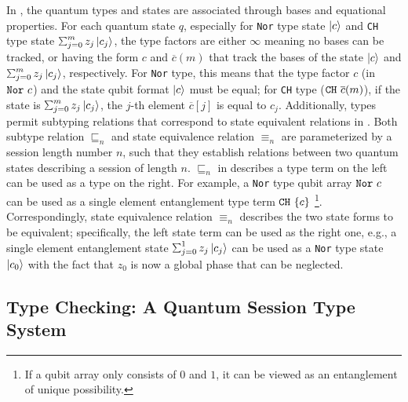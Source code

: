 In \qafny, the quantum types and states are associated through bases and equational properties.
For each quantum state $q$, especially for \texttt{Nor} type state $\left\vert{c}\right\rangle$ and \texttt{CH} type state $\sch{m}{z_j}{c_j}$, the type factors are either $\infty$ meaning no bases can be tracked, or having the form $c$ and $\overline{c}(m)$ that track the bases of the state $\left\vert{c}\right\rangle$ and $\sch{m}{z_j}{c_j}$, respectively. For \texttt{Nor} type, this means that the type factor $c$ (in $\texttt{Nor}~{c}$) and the state qubit format $\left\vert{c}\right\rangle$ must be equal; for \texttt{CH} type ($\texttt{CH}~{\overline{c}(m)}$), if the state is $\sch{m}{z_j}{c_j}$, the $j$-th element $\overline{c}[j]$ is equal to $c_j$.
Additionally, \qafny types permit subtyping relations that correspond to state equivalent relations in . 
Both subtype relation $\sqsubseteq_n$ and state equivalence relation $\equiv_n$ are parameterized by a session length number $n$, such that they establish relations between two quantum states describing a session of length $n$.
$\sqsubseteq_n$ in  describes a type term on the left can be used as a type on the right. For example, a \texttt{Nor} type qubit array $\texttt{Nor}~{c}$ can be used as a single element entanglement type term $\texttt{CH}~{\{c\}}$ \footnote{If a qubit array only consists of $0$ and $1$, it can be viewed as an entanglement of unique possibility. }. 
Correspondingly, state equivalence relation $\equiv_n$ describes the two state forms to be equivalent; specifically, the left state term can be used as the right one, e.g., a single element entanglement state $\sch{1}{z_j}{c_j}$ can be used as a \texttt{Nor} type state $\left\vert{c_0}\right\rangle$ with the fact that $z_0$ is now a global phase that can be neglected.


\subsection{Type Checking: A Quantum Session Type System}\label{sec:typesystem}

